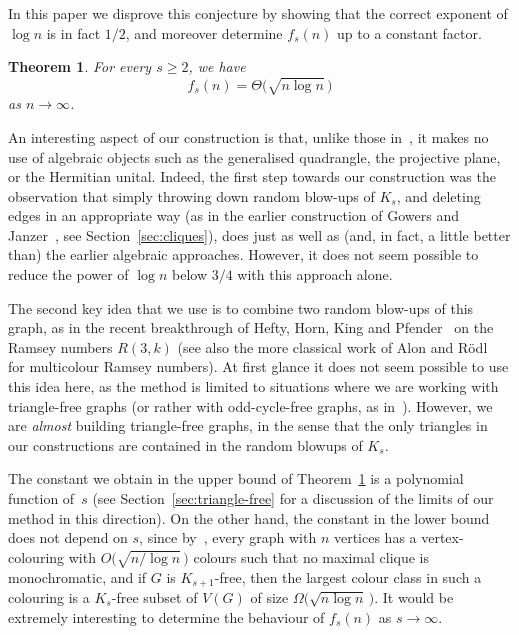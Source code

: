 \documentclass[10pt,a4paper]{amsart}
\newtheorem{theorem}{Theorem}
\numberwithin{theorem}{section}
\renewcommand{\(}{\bigl(}
\renewcommand{\)}{\bigr)\vphantom{)}}
\renewcommand{\ge}{\geqslant}
\newcommand{\N}{\mathbb N}
\begin{document}
In this paper we disprove this conjecture by showing that the correct exponent of $\log n$ is in fact $1/2$, and moreover determine $f_s(n)$ up to a constant factor. %

\begin{theorem}\label{thm:ER} 
For every $s \ge 2$, we have 
\begin{equation}\label{eq:mainthm}
f_s(n) = \Theta\big( \sqrt{n \log n} \, \big) 
\end{equation}
as $n \to \infty$. %
\end{theorem}

An interesting aspect of our construction is that, unlike those in~\cite{DR11,W13,DRR14,MV25}, it makes no use of algebraic objects such as the generalised quadrangle, the projective plane, or the Hermitian unital.
Indeed, the first step towards our construction was the observation that simply throwing down random blow-ups of $K_s$, 
and deleting edges in an appropriate way (as in the earlier construction of Gowers and Janzer~\cite{GJ20}, see Section~\ref{sec:cliques}), does just as well as (and, in fact, a little better than) the earlier algebraic approaches. However, it does not seem possible to reduce the power of $\log n$ below $3/4$ with this approach alone. 

The second key idea that we use is to combine two random blow-ups of this graph, as in the recent breakthrough of Hefty, Horn, King and Pfender~\cite{HHKP25} on the Ramsey numbers $R(3,k)$ (see also the more classical work of Alon and R\"odl~\cite{AR} for multicolour Ramsey numbers). At first glance it does not seem possible to use this idea here, as the method is limited to situations where we are working with triangle-free graphs (or rather with odd-cycle-free graphs, as in~\cite{CJMPS25}). However, we are \emph{almost} building triangle-free graphs, in the sense that the only triangles in our constructions are contained in the random blowups of $K_s$. 

The constant we obtain in the upper bound of Theorem~\ref{thm:ER} is a polynomial function of~$s$ (see Section~\ref{sec:triangle-free} for a discussion of the limits of our method in this direction). On the other hand, the constant in the lower bound does not depend on $s$, since by~\cite[Corollary~2]{JMRS21}, every graph with $n$ vertices has a vertex-colouring with $O\big( \sqrt{n / \log n} \, \big)$ colours such that no maximal clique is monochromatic, and if $G$ is $K_{s+1}$-free, then the largest colour class in such a colouring is a $K_s$-free subset of $V(G)$ of size $\Omega\big( \displaystyle{\sqrt{n \log n}} \, \big)$. It would be extremely interesting to determine the behaviour of $f_s(n)$ as $s \to \infty$. 
\end{document}
